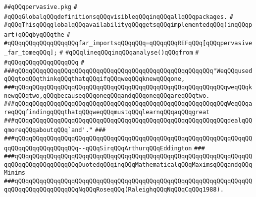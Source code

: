 \label{src/lib/core/init/pervasive.pkg}
\verb|##qQQqpervasive.pkg|\newline
\verb|#|\newline
\verb|#qQQqGlobalqQQqdefinitionsqQQqvisibleqQQqinqQQqallqQQqpackages.|\newline
\verb|#|\newline
\verb|#qQQqThisqQQqglobalqQQqavailabilityqQQqgetsqQQqimplementedqQQq(inqQQqpart)qQQqbyqQQqthe|\newline
\verb|#|\newline
\verb|#qQQqqQQqqQQqqQQqqQQqfar_importsqQQqqQQq=qQQqqQQqREFqQQq[qQQqpervasive_far_tomeqQQq];|\newline
\verb|#|\newline
\verb|#qQQqlineqQQqinqQQqanalyse()qQQqfrom|\newline
\verb|#|\newline
\verb|#qQQqqQQqqQQqqQQqqQQq|\newline
\verb|#|\newline
\newline
\newline
\verb|###qQQqqQQqqQQqqQQqqQQqqQQqqQQqqQQqqQQqqQQqqQQqqQQqqQQqqQQq"WeqQQqusedqQQqtoqQQqthinkqQQqthatqQQqifqQQqweqQQqknewqQQqone,|\newline
\verb|###qQQqqQQqqQQqqQQqqQQqqQQqqQQqqQQqqQQqqQQqqQQqqQQqqQQqqQQqqQQqweqQQqknewqQQqtwo,qQQqbecauseqQQqoneqQQqandqQQqoneqQQqareqQQqtwo.|\newline
\verb|###qQQqqQQqqQQqqQQqqQQqqQQqqQQqqQQqqQQqqQQqqQQqqQQqqQQqqQQqqQQqWeqQQqareqQQqfindingqQQqthatqQQqweqQQqmustqQQqlearnqQQqaqQQqgreat|\newline
\verb|###qQQqqQQqqQQqqQQqqQQqqQQqqQQqqQQqqQQqqQQqqQQqqQQqqQQqqQQqqQQqdealqQQqmoreqQQqaboutqQQq`and'."|\newline
\verb|###|\newline
\verb|###qQQqqQQqqQQqqQQqqQQqqQQqqQQqqQQqqQQqqQQqqQQqqQQqqQQqqQQqqQQqqQQqqQQqqQQqqQQqqQQqqQQqqQQq--qQQqSirqQQqArthurqQQqEddington|\newline
\verb|###|\newline
\verb|###qQQqqQQqqQQqqQQqqQQqqQQqqQQqqQQqqQQqqQQqqQQqqQQqqQQqqQQqqQQqqQQqqQQqqQQqqQQqqQQqqQQqqQQqQuotedqQQqinqQQqMathematicalqQQqMaximsqQQqandqQQqMinims|\newline
\verb|###qQQqqQQqqQQqqQQqqQQqqQQqqQQqqQQqqQQqqQQqqQQqqQQqqQQqqQQqqQQqqQQqqQQqqQQqqQQqqQQqqQQqqQQqNqQQqRoseqQQq(RaleighqQQqNqQQqCqQQq1988).|\newline
